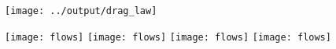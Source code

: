 \documentclass[border=3.141592, preview]{standalone}
\begin{document}
\begin{figure}
    \vspace*{-.8cm}
    \begin{center}
        \texttt{[image: ../output/drag\_law]}\\
    \end{center}
    \vspace{-4.5cm}
    \hspace{1.80cm}\texttt{[image: flows]}
    \hspace{0.82cm}\texttt{[image: flows]}
    \hspace{1.30cm}\texttt{[image: flows]}
    \hspace{1.30cm}\texttt{[image: flows]}
    \vspace{3.5cm}
\end{figure}
\end{document}

